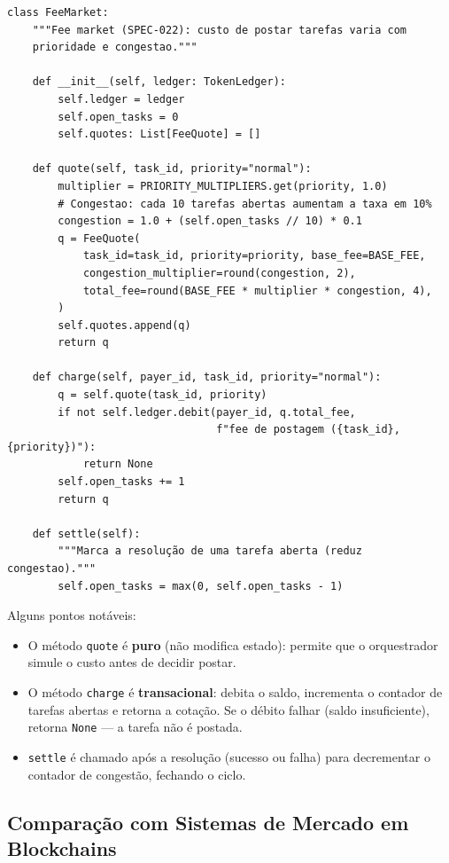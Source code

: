 \begin{verbatim}
class FeeMarket:
    """Fee market (SPEC-022): custo de postar tarefas varia com
    prioridade e congestao."""

    def __init__(self, ledger: TokenLedger):
        self.ledger = ledger
        self.open_tasks = 0
        self.quotes: List[FeeQuote] = []

    def quote(self, task_id, priority="normal"):
        multiplier = PRIORITY_MULTIPLIERS.get(priority, 1.0)
        # Congestao: cada 10 tarefas abertas aumentam a taxa em 10%
        congestion = 1.0 + (self.open_tasks // 10) * 0.1
        q = FeeQuote(
            task_id=task_id, priority=priority, base_fee=BASE_FEE,
            congestion_multiplier=round(congestion, 2),
            total_fee=round(BASE_FEE * multiplier * congestion, 4),
        )
        self.quotes.append(q)
        return q

    def charge(self, payer_id, task_id, priority="normal"):
        q = self.quote(task_id, priority)
        if not self.ledger.debit(payer_id, q.total_fee,
                                 f"fee de postagem ({task_id}, {priority})"):
            return None
        self.open_tasks += 1
        return q

    def settle(self):
        """Marca a resolução de uma tarefa aberta (reduz congestao)."""
        self.open_tasks = max(0, self.open_tasks - 1)
\end{verbatim}

Alguns pontos notáveis:

\begin{itemize}
    \item O método \texttt{quote} é \textbf{puro} (não modifica estado): permite que o orquestrador simule o custo antes de decidir postar.
    \item O método \texttt{charge} é \textbf{transacional}: debita o saldo, incrementa o contador de tarefas abertas e retorna a cotação. Se o débito falhar (saldo insuficiente), retorna \texttt{None} --- a tarefa não é postada.
    \item \texttt{settle} é chamado após a resolução (sucesso ou falha) para decrementar o contador de congestão, fechando o ciclo.
\end{itemize}

\subsection{Comparação com Sistemas de Mercado em Blockchains}

